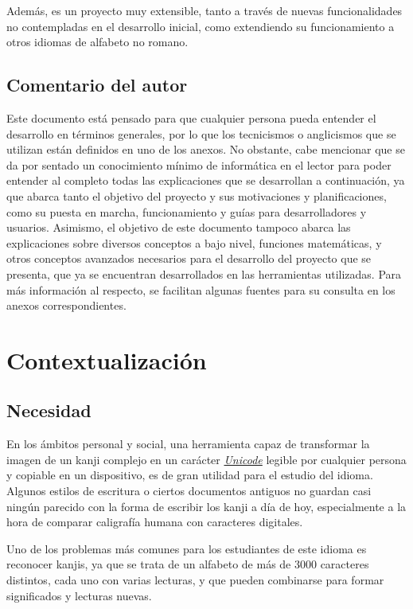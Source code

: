 \documentclass{article}
\begin{document}
Además, es un proyecto muy extensible, tanto a través de nuevas funcionalidades no contempladas en el desarrollo inicial, como extendiendo su funcionamiento a otros idiomas de alfabeto no romano.

\subsection{Comentario del autor}
Este documento está pensado para que cualquier persona pueda entender el desarrollo en términos generales, por lo que los tecnicismos o anglicismos que se utilizan están definidos en uno de los anexos. No obstante, cabe mencionar que se da por sentado un conocimiento mínimo de informática en el lector para poder entender al completo todas las explicaciones que se desarrollan a continuación, ya que abarca tanto el objetivo del proyecto y sus motivaciones y planificaciones, como su puesta en marcha, funcionamiento y guías para desarrolladores y usuarios. Asimismo, el objetivo de este documento tampoco abarca las explicaciones sobre diversos conceptos a bajo nivel, funciones matemáticas, y otros conceptos avanzados necesarios para el desarrollo del proyecto que se presenta, que ya se encuentran desarrollados en las herramientas utilizadas. Para más información al respecto, se facilitan algunas fuentes para su consulta en los anexos correspondientes.


\newpage

\section{Contextualización}
\label{sec:Context}

\subsection{Necesidad}
En los ámbitos personal y social, una herramienta capaz de transformar la imagen de un kanji complejo en un carácter \hyperref[sec:terms]{\textit{Unicode}\tec} legible por cualquier persona y copiable en un dispositivo, es de gran utilidad para el estudio del idioma. Algunos estilos de escritura o ciertos documentos antiguos no guardan casi ningún parecido con la forma de escribir los kanji a día de hoy, especialmente a la hora de comparar caligrafía humana con caracteres digitales.

Uno de los problemas más comunes para los estudiantes de este idioma es reconocer kanjis, ya que se trata de un alfabeto de más de 3000 caracteres distintos, cada uno con varias lecturas, y que pueden combinarse para formar significados y lecturas nuevas.
\end{document}
